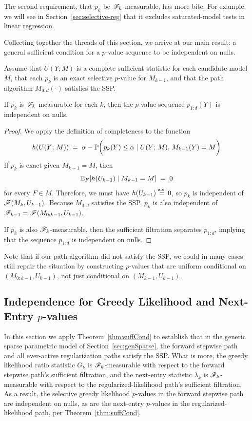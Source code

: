 \documentclass{article}
\begin{document}
The second requirement, that $p_k$ be $\sF_k$-measurable, has more bite. For example, we will see in Section~\ref{sec:selective-reg} that it excludes saturated-model tests in linear regression.

Collecting together the threads of this section, we arrive at our main result: a general sufficient condition for a $p$-value sequence to be independent on nulls.
\begin{theorem} \label{thm:suffCond}
Assume that $U(Y; M)$ is a complete sufficient statistic for each candidate model $M$, that each $p_k$ is an exact selective $p$-value for $M_{k-1}$, and that the path algorithm $M_{0:d}(\cdot)$ satisfies the SSP.

If $p_k$ is $\sF_k$-measurable for each $k$, then the $p$-value sequence $p_{1:d}(Y)$ is independent on nulls.
\end{theorem}

\begin{proof}
We apply the definition of completeness to the function 
\[
h(U(Y; \, M)) \;=\; 
\alpha - \P\bigg(p_k(Y) \leq \alpha \mid U(Y; \, M), \, M_{k-1}(Y) = M\bigg)
\]
If $p_k$ is exact given $M_{k-1} = M$, then 
\[
\E_F[h(U_{k-1}) \mid M_{k-1}=M] \;=\; 0
\] 
for every $F\in M$. Therefore, we must have $h(U_{k-1})\eqAS 0$, so $p_k$ is independent of $\sF(M_k, U_{k-1})$. Because $M_{0:d}$ satisfies the SSP, $p_k$ is also independent of $\sF_{k-1} = \sF(M_{0:k-1}, U_{k-1})$.

If $p_k$ is also $\sF_k$-measurable, then the sufficient filtration separates $p_{1:d}$, implying that the sequence $p_{1:d}$ is independent on nulls.
\end{proof}

Note that if our path algorithm did not satisfy the SSP, we could in many cases still repair the situation by constructing $p$-values that are uniform conditional on $(M_{0:k-1},U_{k-1})$, not just conditional on $(M_{k-1},U_{k-1})$.

\subsection{Independence for Greedy Likelihood and Next-Entry $p$-values}\label{sec:SSP}

In this section we apply Theorem~\ref{thm:suffCond} to establish that in the generic sparse parametric model of Section~\ref{sec:genSparse}, the forward stepwise path and all ever-active regularization paths satisfy the SSP. What is more, the greedy likelihood ratio statistic $G_k$ is $\sF_k$-measurable with respect to the forward stepwise path's sufficient filtration, and the next-entry statistic $\lambda_k$ is $\sF_k$-measurable with respect to the regularized-likelihood path's sufficient filtration. As a result, the selective greedy likelihood $p$-values in the forward stepwise path are independent on nulls, as are the next-entry $p$-values in the regularized-likelihood path, per Theorem~\ref{thm:suffCond}.
\end{document}
